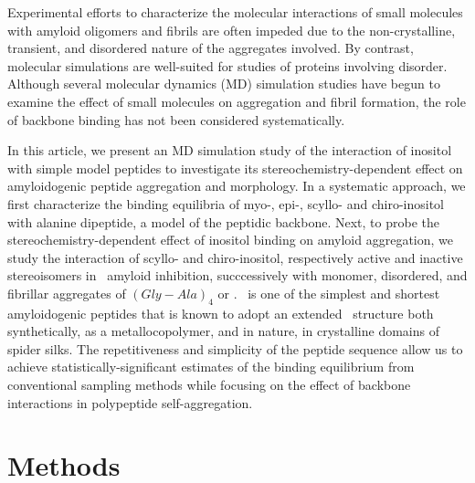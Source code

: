 Experimental efforts to characterize the molecular interactions of small molecules with amyloid oligomers and fibrils are often impeded due to the non-crystalline, transient, and disordered nature of the aggregates involved. By contrast, molecular simulations are well-suited for studies of proteins involving disorder.\cite{Rauscher:2010p88} Although several molecular dynamics (MD) simulation studies have begun to examine the effect of small molecules on aggregation and fibril formation,\cite{Takeda:2010p34,Raman:2009p47,Lemkul:2010p23,Liu:2009p18} the role of backbone binding has not been considered systematically.

In this article, we present an MD simulation study of the interaction of inositol with simple model peptides to investigate its stereochemistry-dependent effect on amyloidogenic peptide aggregation and morphology. In a systematic approach, we first characterize the binding equilibria of myo-, epi-, scyllo- and chiro-inositol with alanine dipeptide, a model of the peptidic backbone. Next, to probe the stereochemistry-dependent effect of inositol binding on amyloid aggregation, we study the interaction of scyllo- and chiro-inositol, respectively active and inactive stereoisomers in \abeta\ amyloid inhibition, succcessively with monomer, disordered, and fibrillar aggregates of $(Gly-Ala)_4$ or \gafour. \gafour\ is one of the simplest and shortest amyloidogenic peptides that is known to adopt an extended \bsheet\ structure both synthetically,\cite{Rathore:2001p37} as a metallocopolymer,\cite{Vandermeulen:2006p15} and in nature, in crystalline domains of spider silks.\cite{Kenney:2002p45,Fossey:1991fk} The repetitiveness and simplicity of the peptide sequence allow us to achieve statistically-significant estimates of the binding equilibrium from conventional sampling methods while focusing on the effect of backbone interactions in polypeptide self-aggregation. 

\section{Methods}
